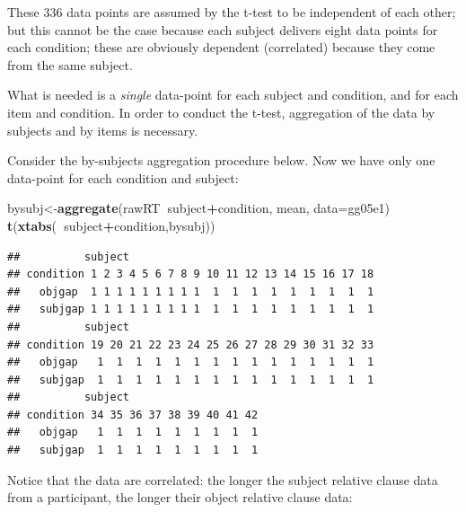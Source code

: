 \documentclass[12pt,]{krantz}
\newenvironment{Shaded}{\begin{snugshade}}{\end{snugshade}}
\newcommand{\DataTypeTok}[1]{\textcolor[rgb]{0.13,0.29,0.53}{#1}}
\newcommand{\KeywordTok}[1]{\textcolor[rgb]{0.13,0.29,0.53}{\textbf{#1}}}
\newcommand{\NormalTok}[1]{#1}
\newcommand{\OperatorTok}[1]{\textcolor[rgb]{0.81,0.36,0.00}{\textbf{#1}}}
\newcommand{\StringTok}[1]{\textcolor[rgb]{0.31,0.60,0.02}{#1}}
\begin{document}
These 336 data points are assumed by the t-test to be independent of each other; but this cannot be the case because each subject delivers eight data points for each condition; these are obviously dependent (correlated) because they come from the same subject.

What is needed is a \emph{single} data-point for each subject and condition, and for each item and condition. In order to conduct the t-test, aggregation of the data by subjects and by items is necessary.

Consider the by-subjects aggregation procedure below. Now we have only one data-point for each condition and subject:

\begin{Shaded}
\begin{Highlighting}[]
\NormalTok{bysubj<-}\KeywordTok{aggregate}\NormalTok{(rawRT}\OperatorTok{~}\NormalTok{subject}\OperatorTok{+}\NormalTok{condition,}
\NormalTok{                  mean,}
                  \DataTypeTok{data=}\NormalTok{gg05e1)}
\KeywordTok{t}\NormalTok{(}\KeywordTok{xtabs}\NormalTok{(}\OperatorTok{~}\NormalTok{subject}\OperatorTok{+}\NormalTok{condition,bysubj))}
\end{Highlighting}
\end{Shaded}

\begin{verbatim}
##          subject
## condition 1 2 3 4 5 6 7 8 9 10 11 12 13 14 15 16 17 18
##   objgap  1 1 1 1 1 1 1 1 1  1  1  1  1  1  1  1  1  1
##   subjgap 1 1 1 1 1 1 1 1 1  1  1  1  1  1  1  1  1  1
##          subject
## condition 19 20 21 22 23 24 25 26 27 28 29 30 31 32 33
##   objgap   1  1  1  1  1  1  1  1  1  1  1  1  1  1  1
##   subjgap  1  1  1  1  1  1  1  1  1  1  1  1  1  1  1
##          subject
## condition 34 35 36 37 38 39 40 41 42
##   objgap   1  1  1  1  1  1  1  1  1
##   subjgap  1  1  1  1  1  1  1  1  1
\end{verbatim}

Notice that the data are correlated: the longer the subject relative clause data from a participant, the longer their object relative clause data:

\begin{Shaded}
\end{Shaded}
\end{document}
